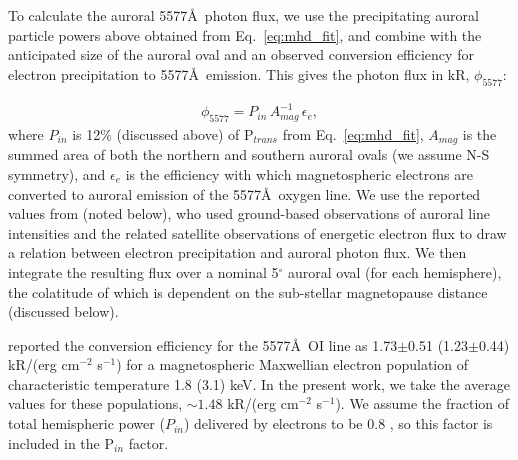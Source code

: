\documentclass{emulateapj}
\newcommand{\XXX}[1]{#1}      %
\begin{document}
\XXX{To calculate the auroral 5577\AA\ photon flux, we use the precipitating auroral particle powers above obtained from Eq.~\ref{eq:mhd_fit}, and combine with the anticipated size of the auroral oval and an observed conversion efficiency for electron precipitation to 5577\AA\ emission. This gives the photon flux in kR, $\phi_{5577}$:}

\begin{align}
    \phi_{5577} = P_{in}\, A_{mag}^{-1}\, \epsilon_e,
\end{align}
%
\XXX{where $P_{in}$ is 12\% (discussed above) of P$_{trans}$ from Eq.~\ref{eq:mhd_fit}, $A_{mag}$ is the summed area of both the northern and southern auroral ovals (we assume N-S symmetry), and $\epsilon_e$ is the efficiency with which magnetospheric electrons are converted to auroral emission of the 5577\AA\ oxygen line.} We use the reported values from \citet{Steele1990} \XXX{(noted below)}, who used ground-based observations of auroral line intensities and the related satellite observations of energetic electron flux to draw a relation between electron precipitation and auroral photon flux. We then integrate the resulting flux over a nominal 5$^\circ$ auroral oval (for each hemisphere), the colatitude of which is dependent on the sub-stellar magnetopause distance \XXX{(discussed below)}. 



\citet{Steele1990} reported the conversion efficiency for the 5577\AA\ OI line as 1.73$\pm$0.51 (1.23$\pm$0.44) kR/(erg cm$^{-2}$ s$^{-1}$) for a magnetospheric Maxwellian electron population of characteristic temperature 1.8 (3.1) keV. In the present work, we take the average values for these populations, ${\sim} 1.48$ kR/(erg cm$^{-2}$ s$^{-1}$). \XXX{We assume the fraction of total hemispheric power ($P_{in}$) delivered by electrons to be 0.8 \citep{Hubert2002}, so this factor is included in the P$_{in}$ factor.}
\end{document}
